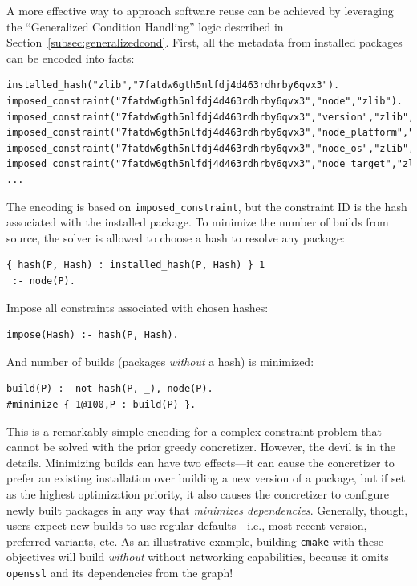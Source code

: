 
A more effective way to approach software reuse can be achieved by leveraging the
``Generalized Condition Handling'' logic described in
Section~\ref{subsec:generalizedcond}. First, all the metadata from installed packages
can be encoded into facts:
\begin{verbatim}
installed_hash("zlib","7fatdw6gth5nlfdj4d463rdhrby6qvx3").
imposed_constraint("7fatdw6gth5nlfdj4d463rdhrby6qvx3","node","zlib").
imposed_constraint("7fatdw6gth5nlfdj4d463rdhrby6qvx3","version","zlib","1.2.11").
imposed_constraint("7fatdw6gth5nlfdj4d463rdhrby6qvx3","node_platform","zlib","linux").
imposed_constraint("7fatdw6gth5nlfdj4d463rdhrby6qvx3","node_os","zlib","ubuntu20.04").
imposed_constraint("7fatdw6gth5nlfdj4d463rdhrby6qvx3","node_target","zlib","icelake").
...
\end{verbatim}
The encoding is based on \texttt{imposed\_constraint}, but the constraint ID is the
hash associated with the installed package. To minimize the number of builds from
source, the solver is allowed to choose a hash to resolve any package:
\begin{verbatim}
{ hash(P, Hash) : installed_hash(P, Hash) } 1
 :- node(P).
\end{verbatim}
Impose all constraints associated with chosen hashes:
\begin{verbatim}
impose(Hash) :- hash(P, Hash).
\end{verbatim}
And number of builds (packages \emph{without} a hash) is minimized:
\begin{verbatim}
build(P) :- not hash(P, _), node(P).
#minimize { 1@100,P : build(P) }.
\end{verbatim}

This is a remarkably simple encoding for a complex constraint problem that cannot be
solved with the prior greedy concretizer. However, the devil is in the details.
Minimizing builds can have two effects---it can cause the concretizer to prefer an
existing installation over building a new version of a package, but if set as the
highest optimization priority, it also causes the concretizer to configure newly built
packages in any way that {\it minimizes dependencies}. Generally, though, users expect
new builds to use regular defaults---i.e., most recent version, preferred variants, etc.
As an illustrative example, building \texttt{cmake} with these objectives will build
{\it without} without networking capabilities, because it omits \texttt{openssl} and its
dependencies from the graph!

